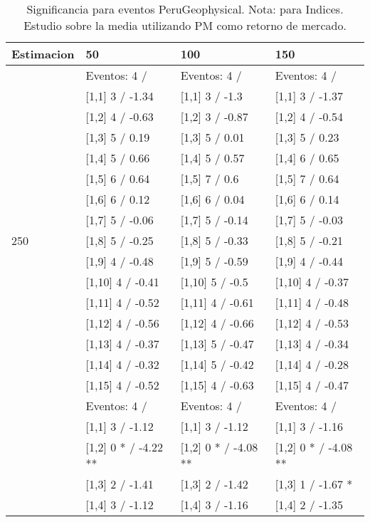 \begin{table}

\caption{Significancia para eventos PeruGeophysical. Nota: para Indices. Estudio sobre la media utilizando PM como retorno de mercado.}
\centering
\begin{tabular}[t]{llll}
\toprule
Estimacion & 50 & 100 & 150\\
\midrule
 & Eventos:  4 / & Eventos:  4 / & Eventos:  4 /\\
 & {}[1,1] 3  / -1.34 & {}[1,1] 3  / -1.3 & {}[1,1] 3  / -1.37\\
 & {}[1,2] 4  / -0.63 & {}[1,2] 3  / -0.87 & {}[1,2] 4  / -0.54\\
 & {}[1,3] 5  / 0.19 & {}[1,3] 5  / 0.01 & {}[1,3] 5  / 0.23\\
 & {}[1,4] 5  / 0.66 & {}[1,4] 5  / 0.57 & {}[1,4] 6  / 0.65\\
\addlinespace
 & {}[1,5] 6  / 0.64 & {}[1,5] 7  / 0.6 & {}[1,5] 7  / 0.64\\
 & {}[1,6] 6  / 0.12 & {}[1,6] 6  / 0.04 & {}[1,6] 6  / 0.14\\
 & {}[1,7] 5  / -0.06 & {}[1,7] 5  / -0.14 & {}[1,7] 5  / -0.03\\
250 & {}[1,8] 5  / -0.25 & {}[1,8] 5  / -0.33 & {}[1,8] 5  / -0.21\\
 & {}[1,9] 4  / -0.48 & {}[1,9] 5  / -0.59 & {}[1,9] 4  / -0.44\\
\addlinespace
 & {}[1,10] 4  / -0.41 & {}[1,10] 5  / -0.5 & {}[1,10] 4  / -0.37\\
 & {}[1,11] 4  / -0.52 & {}[1,11] 4  / -0.61 & {}[1,11] 4  / -0.48\\
 & {}[1,12] 4  / -0.56 & {}[1,12] 4  / -0.66 & {}[1,12] 4  / -0.53\\
 & {}[1,13] 4  / -0.37 & {}[1,13] 5  / -0.47 & {}[1,13] 4  / -0.34\\
 & {}[1,14] 4  / -0.32 & {}[1,14] 5  / -0.42 & {}[1,14] 4  / -0.28\\
\addlinespace
 & {}[1,15] 4  / -0.52 & {}[1,15] 4  / -0.63 & {}[1,15] 4  / -0.47\\
 & Eventos:  4 / & Eventos:  4 / & Eventos:  4 /\\
 & {}[1,1] 3  / -1.12 & {}[1,1] 3  / -1.12 & {}[1,1] 3  / -1.16\\
 & {}[1,2] 0 * / -4.22 ** & {}[1,2] 0 * / -4.08 ** & {}[1,2] 0 * / -4.08 **\\
 & {}[1,3] 2  / -1.41 & {}[1,3] 2  / -1.42 & {}[1,3] 1  / -1.67 *\\
\addlinespace
 & {}[1,4] 3  / -1.12 & {}[1,4] 3  / -1.16 & {}[1,4] 2  / -1.35\\

\end{tabular}
\end{table}
